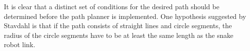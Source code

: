 It is clear that a distinct set of conditions for the desired path should be determined before the path planner is implemented. One hypothesis suggested by Stavdahl \cite{StavdahlNote} is that if the path consists of straight lines and circle segments, the radius of the circle segments have to be at least the same length as the snake robot link.